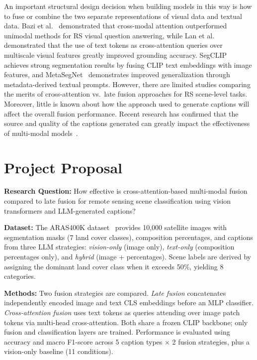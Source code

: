 \documentclass[conference]{IEEEtran}
\begin{document}
An important structural design decision when building models in this way is how to fuse or combine the two separate representations of visual data and textual data. Bazi et al.~\cite{bazi2022bimodal} demonstrated that cross-modal attention outperformed unimodal methods for RS visual question answering, while Lan et al.~\cite{lan2024grounding} demonstrated that the use of text tokens as cross-attention queries over multiscale visual features greatly improved grounding accuracy. SegCLIP~\cite{zhang2024segclip} achieves strong segmentation results by fusing CLIP text embeddings with image features, and MetaSegNet~\cite{wang2024metasegnet} demonstrates improved generalization through metadata-derived textual prompts. However, there are limited studies comparing the merits of cross-attention vs.\ late fusion approaches for RS scene-level tasks. Moreover, little is known about how the approach used to generate captions will affect the overall fusion performance. Recent research has confirmed that the source and quality of the captions generated can greatly impact the effectiveness of multi-modal models~\cite{chen2024sharegpt4v}.

\section{Project Proposal}

\textbf{Research Question:} How effective is cross-attention-based multi-modal fusion compared to late fusion for remote sensing scene classification using vision transformers and LLM-generated captions?

\textbf{Dataset:} The ARAS400K dataset~\cite{caglar2026aras400k} provides 10,000 satellite images with segmentation masks (7 land cover classes), composition percentages, and captions from three LLM strategies: \textit{vision-only} (image only), \textit{text-only} (composition percentages only), and \textit{hybrid} (image + percentages). Scene labels are derived by assigning the dominant land cover class when it exceeds 50\%, yielding 8 categories.

\textbf{Methods:} Two fusion strategies are compared. \textit{Late fusion} concatenates independently encoded image and text CLS embeddings before an MLP classifier. \textit{Cross-attention fusion} uses text tokens as queries attending over image patch tokens via multi-head cross-attention. Both share a frozen CLIP backbone; only fusion and classification layers are trained. Performance is evaluated using accuracy and macro F1-score across 5 caption types $\times$ 2 fusion strategies, plus a vision-only baseline (11 conditions).
\end{document}
